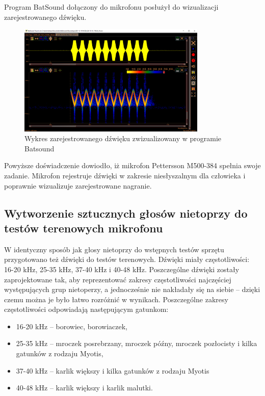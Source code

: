 \documentclass{sprz}
\begin{document}
Program BatSound dołączony do mikrofonu posłużył do wizualizacji zarejestrowanego dźwięku.

\begin{figure}[h]
    \centering
    \includegraphics[width=0.8\textwidth]{sprz/batsound}
    \caption{Wykres zarejestrowanego dźwięku zwizualizowany w programie Batsound}
    \label{img:batsound}
\end{figure}

Powyższe doświadczenie dowiodło, iż mikrofon Pettersson M500-384 spełnia swoje zadanie. Mikrofon rejestruje dźwięki w zakresie niesłyszalnym dla człowieka i poprawnie wizualizuje zarejestrowane nagranie.

\subsection{Wytworzenie sztucznych głosów nietoprzy do testów terenowych mikrofonu}
W identyczny sposób jak głosy nietoprzy do wstępnych testów sprzętu przygotowano też dźwięki do testów terenowych. Dźwięki miały częstotliwości: 16-20 kHz, 25-35 kHz, 37-40 kHz i 40-48 kHz. Poszczególne dźwięki zostały zaprojektowane tak, aby reprezentować zakresy częstotliwości najczęściej występujących grup nietoperzy, a jednocześnie nie nakładały się na siebie – dzięki czemu można je było łatwo rozróżnić w wynikach. Poszczególne zakresy częstotliwości odpowiadają następującym gatunkom:

\begin{itemize}
  \item{16-20 kHz – borowiec, borowiaczek,}
  \item{25-35 kHz – mroczek posrebrzany, mroczek późny, mroczek pozłocisty i kilka gatunków z rodzaju Myotis,}
  \item{37-40 kHz – karlik większy i kilka gatunków z rodzaju Myotis}
  \item{40-48 kHz – karlik większy i karlik malutki.}
\end{itemize}
\end{document}
